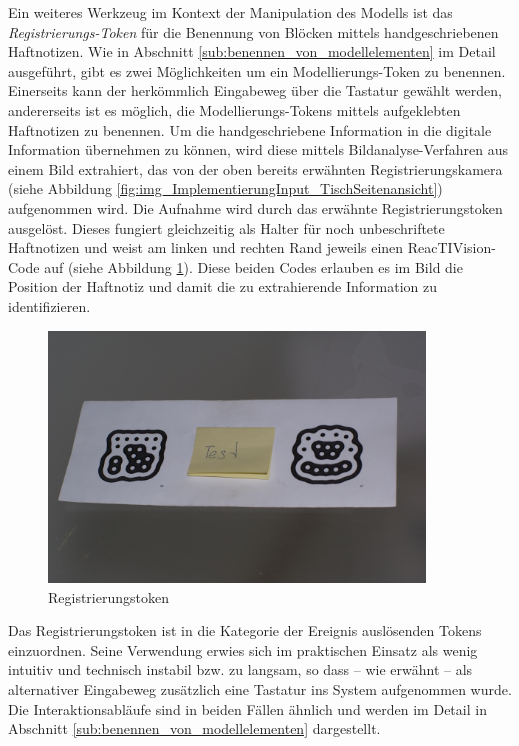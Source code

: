 Ein weiteres Werkzeug im Kontext der Manipulation des Modells ist das \emph{Registrierungs-Token} für die Benennung von Blöcken mittels handgeschriebenen Haftnotizen. Wie in Abschnitt \ref{sub:benennen_von_modellelementen} im Detail ausgeführt, gibt es zwei Möglichkeiten um ein Modellierungs-Token zu benennen. Einerseits kann der herkömmlich Eingabeweg über die Tastatur gewählt werden, andererseits ist es möglich, die Modellierungs-Tokens mittels aufgeklebten Haftnotizen zu benennen. Um die handgeschriebene Information in die digitale Information übernehmen zu können, wird diese mittels Bildanalyse-Verfahren aus einem Bild extrahiert, das von der oben bereits erwähnten Registrierungskamera (siehe Abbildung \ref{fig:img_ImplementierungInput_TischSeitenansicht}) aufgenommen wird. Die Aufnahme wird durch das erwähnte Registrierungstoken ausgelöst. Dieses fungiert gleichzeitig als Halter für noch unbeschriftete Haftnotizen und weist am linken und rechten Rand jeweils einen ReacTIVision-Code auf (siehe Abbildung \ref{fig:img_SystemNeu_Benennungstoken}). Diese beiden Codes erlauben es im Bild die Position der Haftnotiz und damit die zu extrahierende Information zu identifizieren. 

\begin{figure}[htbp]
	\centering
		\includegraphics[width=10cm]{img/SystemNeu/Benennungstoken.jpg}
	\caption{Registrierungstoken}
	\label{fig:img_SystemNeu_Benennungstoken}
\end{figure}

Das Registrierungstoken ist in die Kategorie der Ereignis auslösenden Tokens einzuordnen. Seine Verwendung erwies sich im praktischen Einsatz als wenig intuitiv und technisch instabil bzw. zu langsam, so dass -- wie erwähnt -- als alternativer Eingabeweg zusätzlich eine Tastatur ins System aufgenommen wurde. Die Interaktionsabläufe sind in beiden Fällen ähnlich und werden im Detail in Abschnitt \ref{sub:benennen_von_modellelementen} dargestellt.


